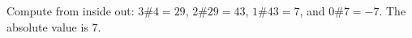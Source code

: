 Compute from inside out: $3\#4=29$, $2\#29=43$, $1\#43=7$, and $0\#7=-7$. The absolute value is $\boxed7$.
